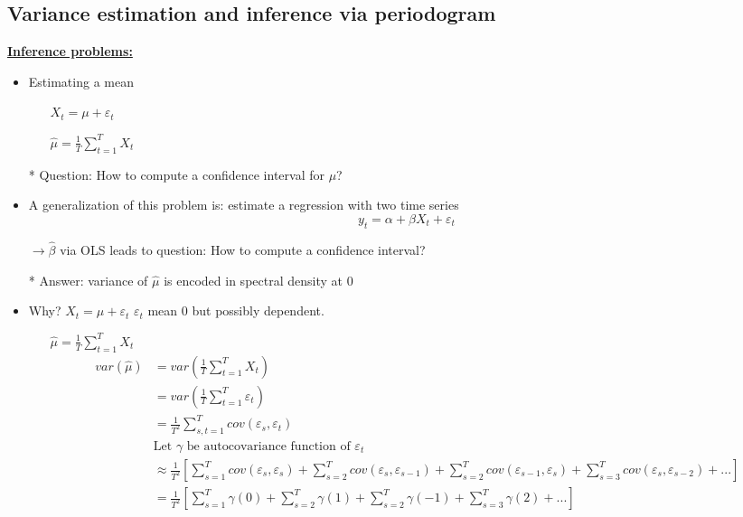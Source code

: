 \subsection{Variance estimation and inference via periodogram}

\textbf{\underline{Inference problems:}}

\begin{itemize}
    \item Estimating a mean 
    \begin{itemize}
        \item[]$X_t=\mu + \varepsilon_t$
        \item[] $\hat{\mu}= \frac{1}{T} \sum_{t=1}^T X_t$ 
    \end{itemize}
    \item[*] Question: How to compute a confidence interval for $\mu$? 
    \item A generalization of this problem is: estimate a regression with two time series \[y_t=\alpha+\beta X_t +\varepsilon_t\]
    \item[] $\rightarrow \hat{\beta}$ via OLS leads to question: How to compute a confidence interval? 
    \item[*] Answer: variance of $\hat{\mu}$ is encoded in spectral density at 0
    \item Why? $X_t = \mu + \varepsilon_t$ $\varepsilon_t$ mean $0$ but possibly dependent.
    \begin{itemize}
        \item[] $\hat{\mu}= \frac{1}{T} \sum_{t=1}^T X_t$
        \begin{align*}
            var(\hat{\mu}) &= var(\frac{1}{T} \sum_{t=1}^T X_t) \\
            &= var(\frac{1}{T} \sum_{t=1}^T \varepsilon_t) \\
            &= \frac{1}{T^2} \sum_{s,t=1}^T cov(\varepsilon_s, \varepsilon_t) \\
            &\text{Let $\gamma$ be autocovariance function of $\varepsilon_t$} \\
            &\approx \frac{1}{T^2} \left[ \sum_{s=1}^T cov(\varepsilon_s, \varepsilon_s) + \sum_{s=2}^T cov(\varepsilon_{s}, \varepsilon_{s-1}) +  \sum_{s=2}^T cov(\varepsilon_{s-1}, \varepsilon_{s})  + \sum_{s=3}^T cov(\varepsilon_{s}, \varepsilon_{s-2}) + ...\right] \\
            &=\frac{1}{T^2} \left[\sum_{s=1}^T \gamma(0) +  \sum_{s=2}^T \gamma(1) + \sum_{s=2}^T \gamma(-1) + \sum_{s=3}^T \gamma(2) + ... \right] \\

\end{align*}
\end{itemize}
\end{itemize}
